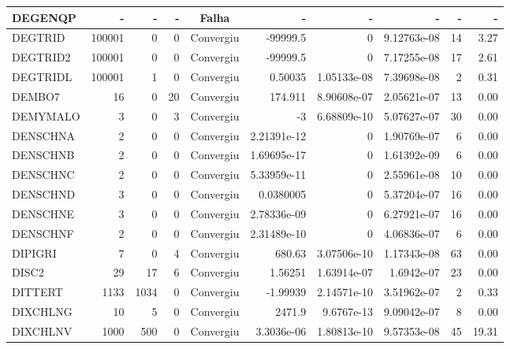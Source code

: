 \begin{center}
\begin{longtable}{|l|r|r|r|c|r|r|r|r|r|}
DEGENQP & - & - & - & Falha & - & - & - & - & - \\ \hline
 DEGTRID & 100001 &      0 &      0 & Convergiu  &    -99999.5 &              0 & 9.12763e-08 &     14 &    3.27 \\ \hline
DEGTRID2 & 100001 &      0 &      0 & Convergiu  &    -99999.5 &              0 & 7.17255e-08 &     17 &    2.61 \\ \hline
DEGTRIDL & 100001 &      1 &      0 & Convergiu  &     0.50035 &    1.05133e-08 & 7.39698e-08 &      2 &    0.31 \\ \hline
  DEMBO7 &     16 &      0 &     20 & Convergiu  &     174.911 &    8.90608e-07 & 2.05621e-07 &     13 &    0.00 \\ \hline
DEMYMALO &      3 &      0 &      3 & Convergiu  &          -3 &    6.68809e-10 & 5.07627e-07 &     30 &    0.00 \\ \hline
DENSCHNA &      2 &      0 &      0 & Convergiu  & 2.21391e-12 &              0 & 1.90769e-07 &      6 &    0.00 \\ \hline
DENSCHNB &      2 &      0 &      0 & Convergiu  & 1.69695e-17 &              0 & 1.61392e-09 &      6 &    0.00 \\ \hline
DENSCHNC &      2 &      0 &      0 & Convergiu  & 5.33959e-11 &              0 & 2.55961e-08 &     10 &    0.00 \\ \hline
DENSCHND &      3 &      0 &      0 & Convergiu  &   0.0380005 &              0 & 5.37204e-07 &     16 &    0.00 \\ \hline
DENSCHNE &      3 &      0 &      0 & Convergiu  & 2.78336e-09 &              0 & 6.27921e-07 &     16 &    0.00 \\ \hline
DENSCHNF &      2 &      0 &      0 & Convergiu  & 2.31489e-10 &              0 & 4.06836e-07 &      6 &    0.00 \\ \hline
 DIPIGRI &      7 &      0 &      4 & Convergiu  &      680.63 &    3.07506e-10 & 1.17343e-08 &     63 &    0.00 \\ \hline
   DISC2 &     29 &     17 &      6 & Convergiu  &     1.56251 &    1.63914e-07 &  1.6942e-07 &     23 &    0.00 \\ \hline
 DITTERT &   1133 &   1034 &      0 & Convergiu  &    -1.99939 &    2.14571e-10 & 3.51962e-07 &      2 &    0.33 \\ \hline
DIXCHLNG &     10 &      5 &      0 & Convergiu  &      2471.9 &     9.6767e-13 & 9.09042e-07 &      8 &    0.00 \\ \hline
DIXCHLNV &   1000 &    500 &      0 & Convergiu  &  3.3036e-06 &    1.80813e-10 & 9.57353e-08 &     45 &   19.31 \\ \hline

\end{longtable}
\end{center}

